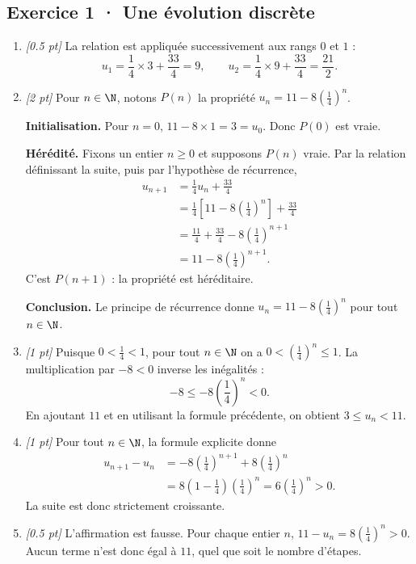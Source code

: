 \subsection*{Exercice 1 · Une évolution discrète}\begin{enumerate}

\item \textit{[\num{0,5} pt]} La relation est appliquée successivement aux rangs $0$ et $1$ :\[u_1=\frac{1}{4}\times 3+\frac{33}{4}=9,\qquad u_2=\frac{1}{4}\times 9+\frac{33}{4}=\frac{21}{2}.\]

\item \textit{[2 pt]} Pour $n\in\N$, notons $P(n)$ la propriété $u_n=11-8\left(\frac{1}{4}\right)^n$.
\par\smallskip\textbf{Initialisation.} Pour $n=0$, $11-8\times1=3=u_0$. Donc $P(0)$ est vraie.
\par\smallskip\textbf{Hérédité.} Fixons un entier $n\ge0$ et supposons $P(n)$ vraie. Par la relation définissant la suite, puis par l'hypothèse de récurrence,
\[\begin{aligned}u_{n+1}&=\frac{1}{4}u_n+\frac{33}{4}\\
&=\frac{1}{4}\left[11-8\left(\frac{1}{4}\right)^n\right]+\frac{33}{4}\\
&=\frac{11}{4}+\frac{33}{4}-8\left(\frac{1}{4}\right)^{n+1}\\
&=11-8\left(\frac{1}{4}\right)^{n+1}.
\end{aligned}\]
C'est $P(n+1)$ : la propriété est héréditaire.
\par\smallskip\textbf{Conclusion.} Le principe de récurrence donne $u_n=11-8\left(\frac{1}{4}\right)^n$ pour tout $n\in\N$.

\item \textit{[1 pt]} Puisque $0<\frac{1}{4}<1$, pour tout $n\in\N$ on a $0<(\frac{1}{4})^n\le1$. La multiplication par $-8<0$ inverse les inégalités :
\[-8\le-8(\frac{1}{4})^n<0.\]
En ajoutant $11$ et en utilisant la formule précédente, on obtient $3\le u_n<11$.

\item \textit{[1 pt]} Pour tout $n\in\N$, la formule explicite donne
\[\begin{aligned}u_{n+1}-u_n&=-8(\frac{1}{4})^{n+1}+8(\frac{1}{4})^n\\&=8(1-\frac{1}{4})(\frac{1}{4})^n=6(\frac{1}{4})^n>0.\end{aligned}\]
La suite est donc strictement croissante.

\item \textit{[\num{0,5} pt]} L'affirmation est fausse. Pour chaque entier $n$, $11-u_n=8(\frac{1}{4})^n>0$. Aucun terme n'est donc égal à $11$, quel que soit le nombre d'étapes.

\end{enumerate}

